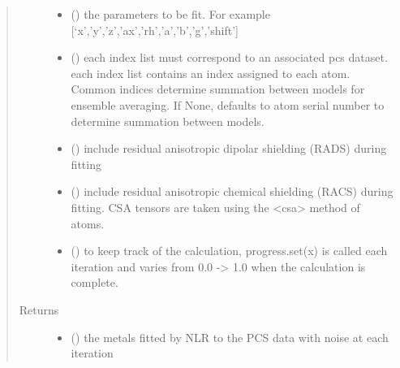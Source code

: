 \documentclass[a4paper,10pt,english]{sphinxmanual}
\begin{document}
\begin{fulllineitems}
\begin{quote}
\begin{description}
\begin{itemize}
\item {} 
 () \textendash{} the parameters to be fit.
For example {[}‘x’,’y’,’z’,’ax’,’rh’,’a’,’b’,’g’,’shift’{]}

\item {} 
 (\sphinxstyleliteralemphasis{\sphinxupquote{, }}) \textendash{} each index list must correspond to an associated pcs dataset.
each index list contains an index assigned to each atom.
Common indices determine summation between models
for ensemble averaging.
If None, defaults to atom serial number to determine summation
between models.

\item {} 
 (\sphinxstyleliteralemphasis{\sphinxupquote{, }}) \textendash{} include residual anisotropic dipolar shielding (RADS) during fitting

\item {} 
 (\sphinxstyleliteralemphasis{\sphinxupquote{, }}) \textendash{} include residual anisotropic chemical shielding (RACS) during fitting.
CSA tensors are taken using the \textless{}csa\textgreater{} method of atoms.

\item {} 
 (\sphinxstyleliteralemphasis{\sphinxupquote{, }}) \textendash{} to keep track of the calculation, progress.set(x) is called each
iteration and varies from 0.0 -\textgreater{} 1.0 when the calculation is complete.

\end{itemize}

\item[{Returns}] \leavevmode
\begin{itemize}
\item {} 
 () \textendash{} the metals fitted by NLR to the PCS data with noise at each iteration


\end{itemize}
\end{description}
\end{quote}
\end{fulllineitems}
\end{document}
